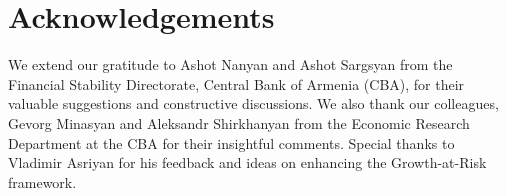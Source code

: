 \section*{Acknowledgements}
We extend our gratitude to Ashot Nanyan and Ashot Sargsyan from the Financial Stability Directorate, Central Bank of Armenia (CBA), for their valuable suggestions and constructive discussions. We also thank our colleagues, Gevorg Minasyan and Aleksandr Shirkhanyan from the Economic Research Department at the CBA for their insightful comments. Special thanks to Vladimir Asriyan for his feedback and ideas on enhancing the Growth-at-Risk framework.